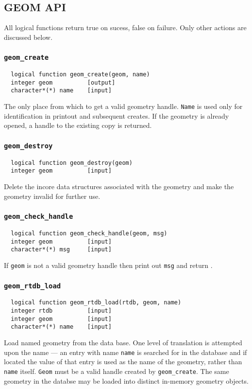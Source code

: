 \subsection{GEOM API}

All logical functions return true on sucess, false on failure.  Only
other actions are discussed below.

\subsubsection{{\tt geom\_create}}
\begin{verbatim}
  logical function geom_create(geom, name)
  integer geom          [output]
  character*(*) name    [input]
\end{verbatim}
The only place from which to get a valid geometry handle.  {\tt Name}
is used only for identification in printout and subsequent creates.
If the geometry is already opened, a handle to the existing copy is
returned.

\subsubsection{{\tt geom\_destroy}}
\begin{verbatim}
  logical function geom_destroy(geom)
  integer geom          [input]
\end{verbatim}
Delete the incore data structures associated with the geometry and
make the geometry invalid for further use.

\subsubsection{{\tt geom\_check\_handle}}
\begin{verbatim}
  logical function geom_check_handle(geom, msg)
  integer geom          [input]
  character*(*) msg     [input]
\end{verbatim}
If {\tt geom} is not a valid geometry handle then print out {\tt msg}
and return \FALSE.

\subsubsection{{\tt geom\_rtdb\_load}}
\begin{verbatim}
  logical function geom_rtdb_load(rtdb, geom, name)
  integer rtdb          [input]
  integer geom          [input]
  character*(*) name    [input]
\end{verbatim}
Load named geometry from the data base.  One level of translation is
attempted upon the name --- an entry with name {\tt name} is searched
for in the database and if located the value of that entry is used as
the name of the geometry, rather than {\tt name} itself.  {\tt Geom}
must be a valid handle created by \verb+geom_create+.  The same
geometry in the databse may be loaded into distinct in-memory geometry
objects.

